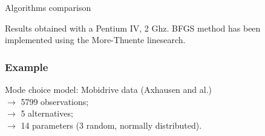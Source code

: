 \documentclass{beamer}
\begin{document}
\begin{frame}{Algorithms comparison}
\begin{footnotesize}
\begin{center}
					\vspace*{0.4cm}
					
				\end{center}
				
				Results obtained with a Pentium IV, 2 Ghz. BFGS method has been implemented
				using the More-Thuente linesearch.
			
		\end{footnotesize}
		
\end{frame}


\begin{frame}[fragile]
\frametitle{Example}

Mode choice model: {\blue Mobidrive} data (Axhausen
and al.)\\
{\red $\rightarrow$} 5799 observations;\\
{\red $\rightarrow$} 5 alternatives;\\
{\red $\rightarrow$} 14 parameters (3 random, normally distributed).


\end{frame}
\end{document}
